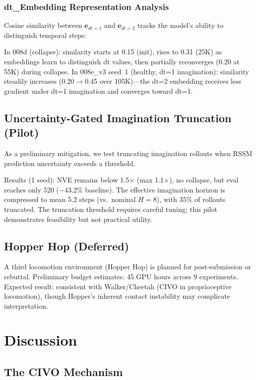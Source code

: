 \documentclass[letterpaper]{article}
\begin{document}
\subsubsection{dt\_Embedding Representation Analysis}

Cosine similarity between $\mathbf{e}_{dt=1}$ and $\mathbf{e}_{dt=2}$ tracks the model's ability to distinguish temporal steps:

In 008d (collapse): similarity starts at 0.15 (init), rises to 0.31 (25K) as embeddings learn to distinguish dt values, then partially reconverges (0.20 at 55K) during collapse.
In 008e\_v3 seed~1 (healthy, dt=1 imagination): similarity steadily increases (0.20$\to$0.45 over 105K)---the dt=2 embedding receives less gradient under dt=1 imagination and converges toward dt=1.

\subsection{Uncertainty-Gated Imagination Truncation (Pilot)}

As a preliminary mitigation, we test truncating imagination rollouts when RSSM prediction uncertainty exceeds a threshold.

Results (1 seed): NVE remains below 1.5$\times$ (max 1.1$\times$), no collapse, but eval reaches only 520 ($-$43.2\% baseline).
The effective imagination horizon is compressed to mean 5.2 steps (vs.\ nominal $H{=}8$), with 35\% of rollouts truncated.
The truncation threshold requires careful tuning; this pilot demonstrates feasibility but not practical utility.

\subsection{Hopper Hop (Deferred)}

A third locomotion environment (Hopper Hop) is planned for post-submission or rebuttal.
Preliminary budget estimates: 45 GPU hours across 9 experiments.
Expected result: consistent with Walker/Cheetah (CIVO in proprioceptive locomotion), though Hopper's inherent contact instability may complicate interpretation.

\section{Discussion}

\subsection{The CIVO Mechanism}
\end{document}
